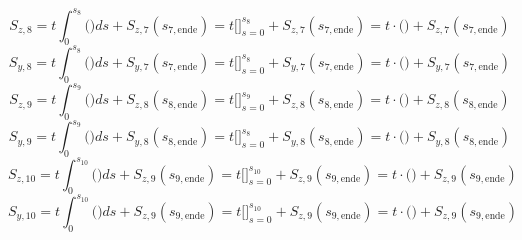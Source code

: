 \begin{itemize}
\begin{equation}
\end{equation}
\begin{equation}
	S_{z,8} = t\int_{0}^{s_8}\bigg(\bigg)ds + S_{z,7}(s_{7,\mathrm{ende}}) = t\bigg[\bigg]_{s=0}^{s_8} + S_{z,7}(s_{7,\mathrm{ende}}) = t\cdot\bigg(\bigg) + S_{z,7}(s_{7,\mathrm{ende}})
\end{equation}
\begin{equation}
	S_{y,8} = t\int_{0}^{s_8}\bigg(\bigg)ds + S_{y,7}(s_{7,\mathrm{ende}}) = t\bigg[\bigg]_{s=0}^{s_8} + S_{y,7}(s_{7,\mathrm{ende}}) = t\cdot\bigg(\bigg) + S_{y,7}(s_{7,\mathrm{ende}})
\end{equation}
\begin{equation}
	S_{z,9} = t\int_{0}^{s_9}\bigg(\bigg)ds + S_{z,8}(s_{8,\mathrm{ende}}) = t\bigg[\bigg]_{s=0}^{s_9} + S_{z,8}(s_{8,\mathrm{ende}}) = t\cdot\bigg(\bigg) + S_{z,8}(s_{8,\mathrm{ende}})
\end{equation}
\begin{equation}
	S_{y,9} = t\int_{0}^{s_9}\bigg(\bigg)ds + S_{y,8}(s_{8,\mathrm{ende}}) = t\bigg[\bigg]_{s=0}^{s_8} + S_{y,8}(s_{8,\mathrm{ende}}) = t\cdot\bigg(\bigg) + S_{y,8}(s_{8,\mathrm{ende}})
\end{equation}
\begin{equation}
	S_{z,10} = t\int_{0}^{s_{10}}\bigg(\bigg)ds + S_{z,9}(s_{9,\mathrm{ende}}) = t\bigg[\bigg]_{s=0}^{s_10} + S_{z,9}(s_{9,\mathrm{ende}}) = t\cdot\bigg(\bigg) + S_{z,9}(s_{9,\mathrm{ende}})
\end{equation}
\begin{equation}
	S_{y,10} = t\int_{0}^{s_{10}}\bigg(\bigg)ds + S_{z,9}(s_{9,\mathrm{ende}}) = t\bigg[\bigg]_{s=0}^{s_{10}} + S_{z,9}(s_{9,\mathrm{ende}}) = t\cdot\bigg(\bigg) + S_{z,9}(s_{9,\mathrm{ende}})
\end{equation}
\end{itemize}
\newpage
